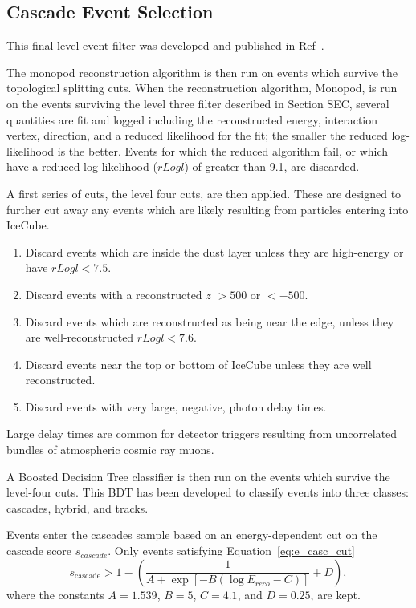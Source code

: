 \documentclass[main.tex]{subfiles}
\begin{document}
\subsection{Cascade Event Selection}

This final level event filter was developed and published in Ref~\cite{2018PhDT17N}.

The monopod reconstruction algorithm is then run on events which survive the topological splitting cuts. 
When the reconstruction algorithm, Monopod, is run on the events surviving the level three filter described in Section SEC, 
several quantities are fit and logged including the reconstructed energy, interaction vertex, direction, and a reduced likelihood for the fit; the smaller the reduced log-likelihood is the better. 
Events for which the reduced algorithm fail, or which have a reduced log-likelihood ($rLogl$) of greater than 9.1, are discarded. 

A first series of cuts, the level four cuts, are then applied. 
These are designed to further cut away any events which are likely resulting from particles entering into IceCube. 
\begin{enumerate}
    \item Discard events which are inside the dust layer unless they are high-energy or have $rLogl<7.5$. 
    \item Discard events with a reconstructed $z$ $>500$ or $<-500$. 
    \item Discard events which are reconstructed as being near the edge, unless they are well-reconstructed $rLogl<7.6$.
    \item Discard events near the top or bottom of IceCube unless they are well reconstructed. 
    \item Discard events with very large, negative, photon delay times. 
\end{enumerate}
Large delay times are common for detector triggers resulting from uncorrelated bundles of atmospheric cosmic ray muons. 

A Boosted Decision Tree classifier is then run on the events which survive the level-four cuts. 
This BDT has been developed to classify events into three classes: cascades, hybrid, and tracks.

Events enter the cascades sample based on an energy-dependent cut on the cascade score $s_{cascade}$. Only events satisfying Equation~\eqref{eq:e_casc_cut}
\begin{equation}
    s_{\text{cascade}} > 1 - \left(\dfrac{1}{A + \exp\left[ -B(\log E_{reco} - C) \right]} + D\right),
\end{equation}\label{eq:e_casc_cut}
where the constants $A=1.539$, $B=5$, $C=4.1$, and $D=0.25$, are kept. 
\end{document}
